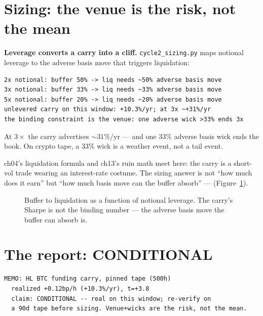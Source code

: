 \section{Sizing: the venue is the risk, not the mean}\label{sec:size18}

\begin{example}\label{ex:liq18}
\textbf{Leverage converts a carry into a cliff.}
\texttt{cycle2\_sizing.py} maps notional leverage to the
adverse basis move that triggers liquidation:
\begin{verbatim}
2x notional: buffer 50% -> liq needs ~50% adverse basis move
3x notional: buffer 33% -> liq needs ~33% adverse basis move
5x notional: buffer 20% -> liq needs ~20% adverse basis move
unlevered carry on this window: +10.3%/yr; at 3x ~+31%/yr
the binding constraint is the venue: one adverse wick >33% ends 3x
\end{verbatim}
At $3\times$ the carry advertises $\sim31\%$/yr --- and one
$33\%$ adverse basis wick ends the book. On crypto tape, a
$33\%$ wick is a weather event, not a tail event.
\begin{solution}
ch04's liquidation formula and ch13's ruin math meet here:
the carry is a short-vol trade wearing an interest-rate
costume. The sizing answer is not ``how much does it earn''
but ``how much basis move can the buffer absorb'' ---
(Figure~\ref{fig:liqmap}).
\end{solution}
\end{example}

\begin{figure}[htbp]\centering

\caption{Buffer to liquidation as a function of notional
leverage. The carry's Sharpe is not the binding number ---
the adverse basis move the buffer can absorb is.}
\label{fig:liqmap}
\end{figure}

\section{The report: CONDITIONAL}\label{sec:report18}

\begin{verbatim}
MEMO: HL BTC funding carry, pinned tape (500h)
  realized +0.12bp/h (+10.3%/yr), t=+3.8
  claim: CONDITIONAL -- real on this window; re-verify on
  a 90d tape before sizing. Venue+wicks are the risk, not the mean.
\end{verbatim}

